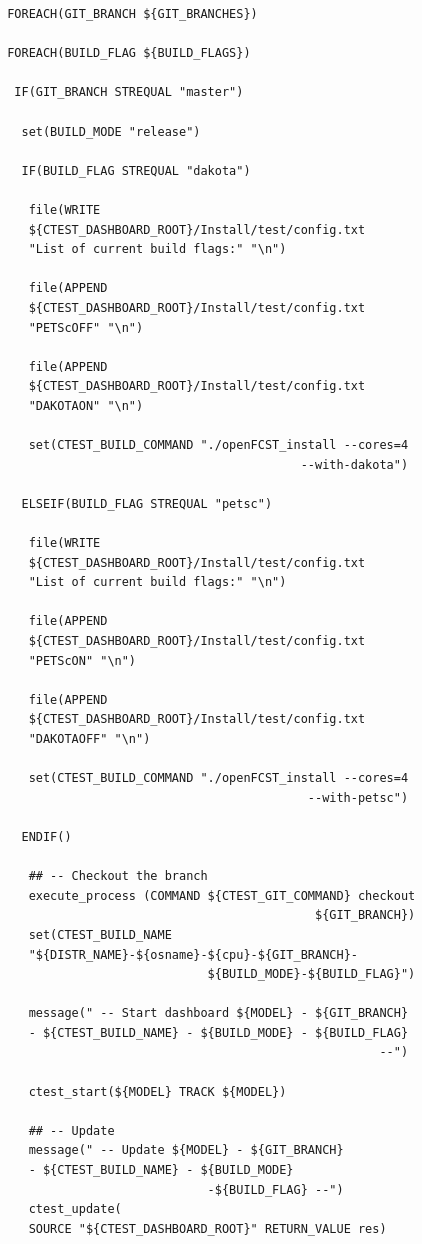 \small \begin{lstlisting}
 FOREACH(GIT_BRANCH ${GIT_BRANCHES})

 FOREACH(BUILD_FLAG ${BUILD_FLAGS})

  IF(GIT_BRANCH STREQUAL "master")

   set(BUILD_MODE "release")

   IF(BUILD_FLAG STREQUAL "dakota")
   
    file(WRITE
    ${CTEST_DASHBOARD_ROOT}/Install/test/config.txt
    "List of current build flags:" "\n")
    
    file(APPEND
    ${CTEST_DASHBOARD_ROOT}/Install/test/config.txt
    "PETScOFF" "\n")
    
    file(APPEND
    ${CTEST_DASHBOARD_ROOT}/Install/test/config.txt
    "DAKOTAON" "\n")
     
    set(CTEST_BUILD_COMMAND "./openFCST_install --cores=4
                                          --with-dakota")
                                          
   ELSEIF(BUILD_FLAG STREQUAL "petsc")
   
    file(WRITE
    ${CTEST_DASHBOARD_ROOT}/Install/test/config.txt
    "List of current build flags:" "\n")
    
    file(APPEND
    ${CTEST_DASHBOARD_ROOT}/Install/test/config.txt
    "PETScON" "\n")
    
    file(APPEND
    ${CTEST_DASHBOARD_ROOT}/Install/test/config.txt
    "DAKOTAOFF" "\n")
    
    set(CTEST_BUILD_COMMAND "./openFCST_install --cores=4
                                           --with-petsc")
                                           
   ENDIF()

    ## -- Checkout the branch
    execute_process (COMMAND ${CTEST_GIT_COMMAND} checkout
                                            ${GIT_BRANCH})
    set(CTEST_BUILD_NAME
    "${DISTR_NAME}-${osname}-${cpu}-${GIT_BRANCH}-
                             ${BUILD_MODE}-${BUILD_FLAG}")

    message(" -- Start dashboard ${MODEL} - ${GIT_BRANCH}
    - ${CTEST_BUILD_NAME} - ${BUILD_MODE} - ${BUILD_FLAG}
                                                     --")
                                                       
    ctest_start(${MODEL} TRACK ${MODEL})

    ## -- Update
    message(" -- Update ${MODEL} - ${GIT_BRANCH}
    - ${CTEST_BUILD_NAME} - ${BUILD_MODE}
                             -${BUILD_FLAG} --")
    ctest_update(
    SOURCE "${CTEST_DASHBOARD_ROOT}" RETURN_VALUE res)


\end{lstlisting}
